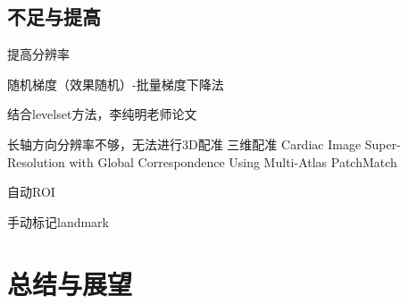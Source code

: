
\section{不足与提高}

提高分辨率


随机梯度（效果随机）-批量梯度下降法

结合levelset方法，李纯明老师论文

长轴方向分辨率不够，无法进行3D配准
三维配准
Cardiac Image Super-Resolution with Global Correspondence Using Multi-Atlas PatchMatch

自动ROI

手动标记landmark\par
\chapter{总结与展望}
